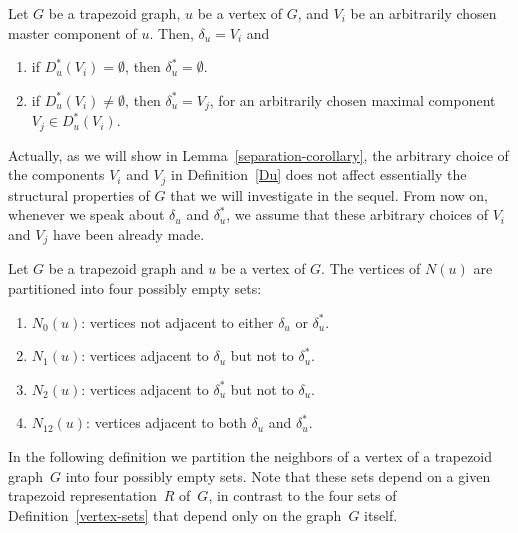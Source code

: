 \documentclass[proceedings]{stacs}
\begin{document}
\begin{definition}
\label{Du}Let $G$ be a trapezoid graph, $u$ be a vertex of $G$, and $V_{i}$
be an arbitrarily chosen master component of $u$. Then, $\delta_{u}=V_{i}$ and
\begin{enumerate}
\item if $D_{u}^{\ast }(V_{i})=\emptyset $, then $\delta_{u}^{\ast}=\emptyset $.
\item if $D_{u}^{\ast }(V_{i})\neq \emptyset $, then $\delta_{u}^{\ast }={V_{j}}$, 
for an arbitrarily chosen maximal component $V_{j}\in {D_{u}^{\ast }(V_{i})}$.
\end{enumerate}
\end{definition}

Actually, as we will show in Lemma~\ref{separation-corollary}, 
the arbitrary choice of the components $V_{i}$ and $V_{j}$ in Definition~\ref{Du} 
does not affect essentially the structural properties of $G$ that we will 
investigate in the sequel.
From now on, whenever we speak about $\delta_{u}$ and $\delta_{u}^{\ast}$, 
we assume that these arbitrary choices of $V_{i}$ and $V_{j}$ have been already made.

\begin{definition}
\label{vertex-sets}Let $G$ be a trapezoid graph and $u$ be a vertex of $G$.
The vertices of $N(u)$ are partitioned into four possibly empty sets:
\begin{enumerate}
\item $N_{0}(u)$: vertices not adjacent to either ${\delta_{u}}$ or ${\delta_{u}^{\ast}}$.
\item $N_{1}(u)$: vertices adjacent to ${\delta_{u}}$ but not to ${\delta_{u}^{\ast }}$.
\item $N_{2}(u)$: vertices adjacent to ${\delta_{u}^{\ast }}$ but not to ${\delta_{u}}$.
\item $N_{12}(u)$: vertices adjacent to both ${\delta_{u}}$ and ${\delta_{u}^{\ast }}$.
\end{enumerate}
\end{definition}

In the following definition we partition the neighbors of a vertex of a
trapezoid graph~$G$ into four possibly empty sets. 
Note that these sets depend on a given trapezoid representation~$R$ of~$G$, in contrast
to the four sets of Definition~\ref{vertex-sets} that depend only on the graph~$G$ itself. 
\end{document}
